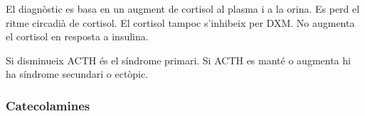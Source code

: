 El diagnòstic es basa en un augment de cortisol al plasma i a la
orina. Es perd el ritme circadià de cortisol. El cortisol tampoc
s'inhibeix per DXM. No augmenta el cortisol en resposta a insulina.

Si disminueix ACTH és el síndrome primari. Si ACTH es manté o augmenta
hi ha síndrome secundari o ectòpic.


\subsubsection{Catecolamines}
\label{sec:catecolamines}

